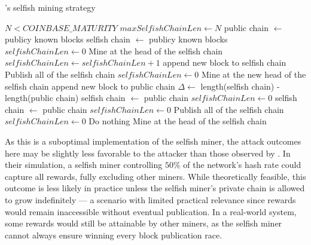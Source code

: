 \begin{algorithm}
	\caption{\iblock{}'s selfish mining strategy}\label{alg:selfish-miner}
	\begin{algorithmic}[1]
		\Require \(N < COINBASE\_MATURITY\)
		\Statex
			\State \(maxSelfishChainLen \gets N\)
			\State public chain \(\gets\) publicy known blocks
			\State selfish chain \(\gets\) publicy known blocks
			\State \(selfishChainLen \gets 0\)
			\State Mine at the head of the selfish chain
		\EndEvent
		\Statex
			\State \(selfishChainLen \gets selfishChainLen + 1\)
			\State append new block to selfish chain
				\State Publish all of the selfish chain
				\State \(selfishChainLen \gets 0\)
			\EndIf
			\State Mine at the new head of the selfish chain
		\EndEvent
		\Statex
			\State append new block to public chain
			\State \(\Delta \gets\) length(selfish chain) -
			length(public chain)
				\State selfish chain \(\gets\) public chain
				\State \(selfishChainLen \gets 0\)
				\State selfish chain \(\gets\) public chain
				\State \(selfishChainLen \gets 0\)
				\State Publish all of the selfish
				chain
				\State \(selfishChainLen \gets 0\)
			\Else{}
				\State Do nothing
			\EndIf
			\State Mine at the head of the selfish chain
		\EndEvent
	\end{algorithmic}
\end{algorithm}

As this is a suboptimal implementation of the selfish miner, the attack
outcomes here may be slightly less favorable to the attacker than those
observed by \citeauthor{selfish-mining}. In their simulation, a selfish miner
controlling \(50\%\) of the network's hash rate could capture all rewards,
fully excluding other miners. While theoretically feasible, this outcome is
less likely in practice unless the selfish miner's private chain is allowed to
grow indefinitely --- a scenario with limited practical relevance since rewards
would remain inaccessible without eventual publication. In a real-world system,
some rewards would still be attainable by other miners, as the selfish miner
cannot always ensure winning every block publication race.


